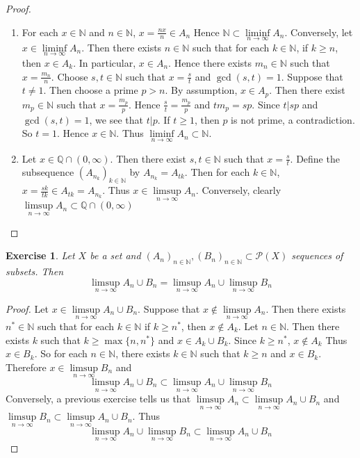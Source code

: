 \documentclass[12pt]{amsart}
\newtheorem{ex}[thm]{Exercise}
\newcommand{\N}{\mathbb{N}}
\newcommand{\Q}{\mathbb{Q}}
\newcommand{\MP}{\mathcal{P}}
\begin{document}
\begin{proof}\
	\begin{enumerate}
		\item For each $x \in \N$ and $n \in \N$, $x = \frac{nx}{n} \in A_n$ Hence $\N \subset \liminf\limits_{n \rightarrow \infty }A_n$. Conversely, let $x \in \liminf\limits_{n \rightarrow \infty }A_n$. Then there exists $n \in \N$ such that for each $k \in \N$, if $k \geq n$, then $x \in A_k$. In particular, $x \in A_n$. Hence there exists $m_n \in \N$ such that $x = \frac{m_n}{n}$. Choose $s,t \in \N$ such that $x= \frac{s}{t}$ and $\gcd(s,t) = 1$. Suppose that $t \neq 1$. Then choose a prime $p > n$. By assumption, $x \in A_p$. Then there exist $m_p \in \N$ such that $x = \frac{m_p}{p}$. Hence $\frac{s}{t} = \frac{m_p}{p}$ and $tm_p = sp$. Since $t \vert sp$ and $\gcd(s,t) = 1$, we see that $t \vert p$. If $t \geq 1$, then $p$ is not prime, a contradiction. So $t = 1$. Hence $x \in \N$. Thus $\liminf\limits_{n \rightarrow \infty }A_n \subset \N$. 
		\item Let $x \in \Q \cap (0, \infty)$. Then there exist $s,t \in \N$ such that $x = \frac{s}{t}$. Define the subsequence $(A_{n_k})_{k \in \N}$ by $A_{n_k} = A_{tk}$. Then for each $k \in \N$, $x = \frac{sk}{tk} \in A_{tk} = A_{n_k}$. Thus $x \in \limsup\limits_{n \rightarrow \infty }A_n$. Conversely, clearly $\limsup\limits_{n \rightarrow \infty }A_n \subset \Q \cap (0, \infty)$ 
	\end{enumerate}
\end{proof}

\begin{ex}
	Let $X$ be a set and $(A_n)_{n \in \N}, (B_n)_{n \in \N} \subset \MP(X)$ sequences of subsets. Then $$\limsup\limits_{n \rightarrow \infty} A_n \cup B_n= \limsup\limits_{n \rightarrow \infty} A_n \cup \limsup\limits_{n \rightarrow \infty} B_n$$
\end{ex}

\begin{proof}
	Let $x \in \limsup\limits_{n \rightarrow \infty} A_n \cup B_n$. Suppose that $x \not \in \limsup\limits_{n \rightarrow \infty} A_n$. Then there exists $n^* \in \N$ such that for each $k \in \N$ if $ k \geq n^*$, then $x \not \in A_k$. Let $n \in \N$. Then there exists $k$ such that $k \geq \max\{n, n^*\}$ and $x \in A_{k} \cup B_k$. Since $k \geq n^*$, $x \not \in A_{k}$ Thus $x \in B_k$. So for each $n \in \N$, there exists $k \in \N$ such that $k \geq n$ and $x \in B_k$. Therefore $x \in \limsup\limits_{n \rightarrow \infty}  B_n$ and $$\limsup\limits_{n \rightarrow \infty} A_n \cup B_n \subset \limsup\limits_{n \rightarrow \infty} A_n \cup \limsup\limits_{n \rightarrow \infty} B_n$$ Conversely, a previous exercise tells us that $\limsup\limits_{n \rightarrow \infty} A_n \subset \limsup\limits_{n \rightarrow \infty} A_n \cup B_n$ and $\limsup\limits_{n \rightarrow \infty}  B_n \subset \limsup\limits_{n \rightarrow \infty} A_n \cup B_n$. Thus $$ \limsup\limits_{n \rightarrow \infty} A_n \cup \limsup\limits_{n \rightarrow \infty} B_n \subset \limsup\limits_{n \rightarrow \infty} A_n \cup B_n$$
\end{proof}
\end{document}
